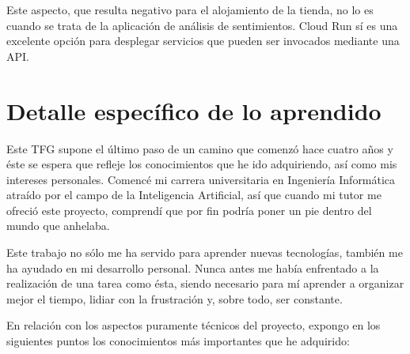 Este aspecto, que resulta negativo para el alojamiento de la tienda, no lo es cuando se trata de la aplicación de análisis de sentimientos. Cloud Run sí es una excelente opción para desplegar servicios que pueden ser invocados mediante una API.

\section{Detalle específico de lo aprendido}

Este TFG supone el último paso de un camino que comenzó hace cuatro años y éste se espera que refleje los conocimientos que he ido adquiriendo, así como mis intereses personales. Comencé mi carrera universitaria en Ingeniería Informática atraído por el campo de la Inteligencia Artificial, así que cuando mi tutor me ofreció este proyecto, comprendí que por fin podría poner un pie dentro del mundo que anhelaba.

Este trabajo no sólo me ha servido para aprender nuevas tecnologías, también me ha ayudado en mi desarrollo personal. Nunca antes me había enfrentado a la realización de una tarea como ésta, siendo necesario para mí aprender a organizar mejor el tiempo, lidiar con la frustración y, sobre todo, ser constante.

En relación con los aspectos puramente técnicos del proyecto, expongo en los siguientes puntos los conocimientos más importantes que he adquirido:

